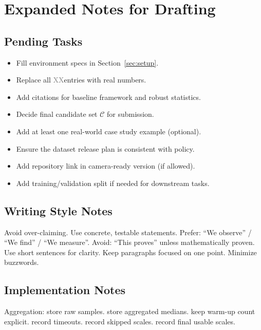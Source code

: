 \documentclass[conference]{IEEEtran}
\newcommand{\placeholder}{\textcolor{gray}{XX}}
\begin{document}
\section{Expanded Notes for Drafting}


\subsection{Pending Tasks}
\begin{itemize}[leftmargin=1.2em]
\item Fill environment specs in Section~\ref{sec:setup}.
\item Replace all \placeholder entries with real numbers.
\item Add citations for baseline framework and robust statistics.
\item Decide final candidate set $\mathcal{C}$ for submission.
\item Add at least one real-world case study example (optional).
\item Ensure the dataset release plan is consistent with policy.
\item Add repository link in camera-ready version (if allowed).
\item Add training/validation split if needed for downstream tasks.
\end{itemize}

\subsection{Writing Style Notes}
Avoid over-claiming.
Use concrete, testable statements.
Prefer:
``We observe'' / ``We find'' / ``We measure''.
Avoid:
``This proves'' unless mathematically proven.
Use short sentences for clarity.
Keep paragraphs focused on one point.
Minimize buzzwords.

\subsection{Implementation Notes}
Aggregation:
store raw samples.
store aggregated medians.
keep warm-up count explicit.
record timeouts.
record skipped scales.
record final usable scales.
\end{document}
